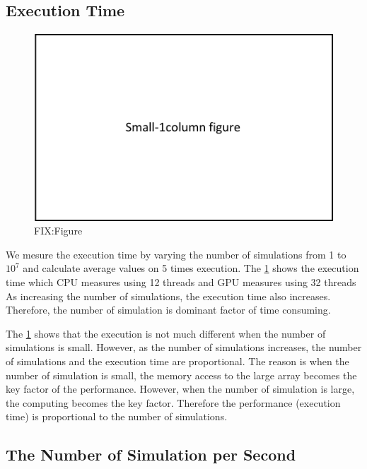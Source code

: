 \documentclass[conference]{IEEEtran}
\begin{document}
\subsection{Execution Time}
\begin{figure}
\includegraphics{figures/fit_1col.pdf}
\caption{FIX:Figure}
\label{fig:time_consuming}
\end{figure}

We mesure the execution time by varying the number of simulations from 1 to $10^7$ and calculate average values on 5 times execution. 
The \cref{fig:time_consuming} shows the execution time which CPU measures using 12 threads and GPU measures using 32 threads
As increasing the number of simulations, the execution time also increases. Therefore, the number of simulation is dominant factor of time consuming. 

The \cref{fig:time_consuming} shows that the execution is not much different when the number of simulations is small. 
However, as the number of simulations increases, the number of simulations and the execution time are proportional.
The reason is when the number of simulation is small, the memory access to the large array becomes the key factor of the performance. However, when the number of simulation is large, the computing becomes the key factor. Therefore the performance (execution time) is proportional to the number of simulations.

\subsection{The Number of Simulation per Second}
\end{document}
